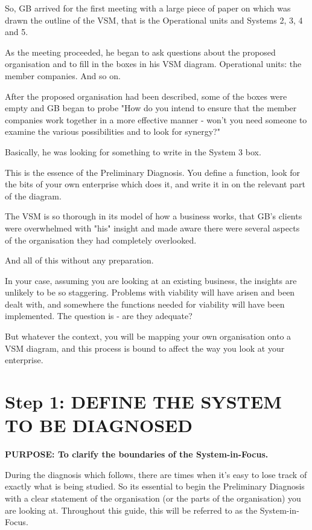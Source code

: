 So, GB arrived for the first meeting with a large piece of paper on which was drawn the outline of the VSM, that is the Operational units and Systems 2, 3, 4 and 5.

As the meeting proceeded, he began to ask questions about the proposed organisation and to fill in the boxes in his VSM diagram. Operational units: the member companies. And so on.

After the proposed organisation had been described, some of the boxes were empty and GB began to probe "How do you intend to ensure that the member companies work together in a more effective manner - won't you need someone to examine the various possibilities and to look for synergy?"

Basically, he was looking for something to write in the System 3 box.

This is the essence of the Preliminary Diagnosis. You define a function, look for the bits of your own enterprise which does it, and write it in on the relevant part of the diagram.

The VSM is so thorough in its model of how a business works, that GB's clients were overwhelmed with "his" insight and made aware there were several aspects of the organisation they had completely overlooked.

And all of this without any preparation.

In your case, assuming you are looking at an existing business, the insights are unlikely to be so staggering. Problems with viability will have arisen and been dealt with, and somewhere the functions needed for viability will have been implemented. The question is - are they adequate?

But whatever the context, you will be mapping your own organisation onto a VSM diagram, and this process is bound to affect the way you look at your enterprise.

\section*{Step 1: DEFINE THE SYSTEM TO BE DIAGNOSED}
\textbf{PURPOSE: To clarify the boundaries of the System-in-Focus.}

During the diagnosis which follows, there are times when it's easy to lose track of exactly what is being studied. So its essential to begin the Preliminary Diagnosis with a clear statement of the organisation (or the parts of the organisation) you are looking at. Throughout this guide, this will be referred to as the System-in-Focus.

